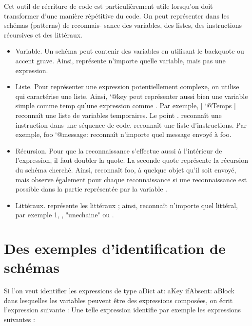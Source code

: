 \documentclass[a4paper,10pt,twoside]{book}
\begin{document}
Cet outil de r\'ecriture de code est particuli\`erement utile lorsqu'on
doit transformer d'une mani\`ere r\'ep\'etitive du code. On peut repr\'esenter
dans les sch\'emas (patterns) de reconnais- sance des variables, des
listes, des instructions r\'ecursives et des litt\'eraux.

\begin{itemize}
\item	Variable. Un sch\'ema peut contenir des variables en utilisant
  le backquote ou accent grave. Ainsi,  repr\'esente n'importe
  quelle variable, mais pas une expression.

\item Liste. Pour repr\'esenter une expression potentiellement
  complexe, on utilise  qui caract\'erise une liste. Ainsi, `@key
  peut repr\'esenter aussi bien une variable simple comme temp qu'une
  expression comme . Par exemple, | `@Temps
  | reconnaît une liste de variables temporaires. Le point . reconnaît
  une instruction dans une s\'equence de code.
  reconnaît une liste d'instructions. Par exemple, foo `@message:
   reconnaît n'importe quel message envoy\'e à foo.


\item R\'ecursion. Pour que la reconnaissance s'effectue aussi à
  l'int\'erieur de l'expression, il faut doubler la quote. La seconde
  quote repr\'esente la r\'ecursion du sch\'ema cherch\'e. Ainsi,
   reconnaît foo, à quelque objet qu'il soit envoy\'e,
  mais observe \'egalement pour chaque reconnaissance si une
  reconnaissance est possible dans la partie repr\'esent\'ee par la
  variable .

\item	Litt\'eraux. \ct{\\#} repr\'esente les litt\'eraux ; ainsi, 
  reconnaît n'importe quel litt\'eral, par exemple 1, \ct{\\#()}, "unechaine"
  ou .
\end{itemize}

\section{Des exemples d'identification de sch\'emas}

Si l'on veut identifier les expressions de type
aDict at: aKey ifAbsent: aBlock dans lesquelles les variables peuvent être des expressions compos\'ees, on \'ecrit l'expression
suivante :
Une telle expression identifie par exemple les expressions suivantes :
\end{document}
